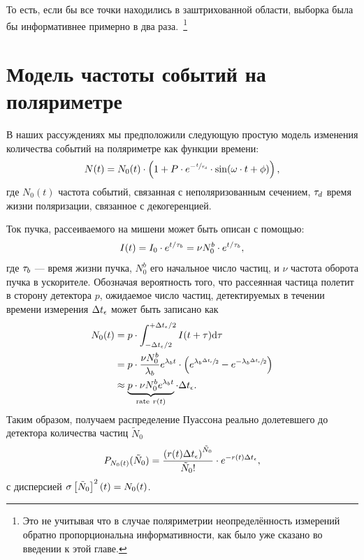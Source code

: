 То есть, если бы все точки находились в заштрихованной области, выборка была бы информативнее примерно в два раза.~\footnote{Это не учитывая что в случае поляриметрии неопределённость измерений обратно пропорциональна информативности, как было уже сказано во введении к этой главе.}

\section{Модель частоты событий на поляриметре}\label{Apx:Stats:Detector_counting_rate}
В наших рассуждениях мы предположили следующую простую модель
изменения количества событий на поляриметре как функции времени:
\begin{equation}\label{eq:DetCntRt}
N(t) = N_0(t)\cdot\bkt{1 + P\cdot e^{-\sfrac{t}{\LTd}}\cdot\sin(\w\cdot t + \phi)},
\end{equation}
где $N_0(t)$ частота событий, связанная с неполяризованным сечением,
$\tau_d$ время жизни поляризации, связанное с декогеренцией.

Ток пучка, рассеиваемого на мишени может быть описан с помощью:
\[
I(t)= I_0\cdot e^{t/\tau_b} = \nu N_0^b\cdot e^{t/\tau_b},
\]
где $\tau_b$ --- время жизни пучка, $N_0^b$ его начальное число частиц,
и $\nu$ частота оборота пучка в ускорителе. Обозначая вероятность того, 
что рассеянная частица полетит в сторону детектора $p$, ожидаемое число
частиц, детектируемых в течении времени измерения $\Delta t_{\epsilon}$ может быть
записано как
\begin{align}
N_0(t) & = p\cdot\int_{-\dtm/2}^{+\dtm/2} I(t+\tau)\rd\tau \notag                    \\
& = p\cdot\frac{\nu N_0^b}{\lamb} e^{\lamb t}\cdot \bkt{e^{\lamb\sfrac{\dtm}{2}} - e^{-\lamb\sfrac{\dtm}{2}}} \notag \\
& \approx \underbrace{p\cdot\nu N_0^b e^{\lamb t}}_{\text{rate}~r(t)} \cdot\dtm.
\end{align}
Таким образом, получаем распределение Пуассона 
реально долетевшего до детектора количества частиц $\tilde{N}_0$
\[
P_{N_0(t)}(\tilde{N}_0) = \frac{\bkt{r(t)\dtm}^{\tilde{N}_0}}{\tilde{N}_0!}\cdot e^{-r(t)\dtm},
\]
с дисперсией $\SD{\tilde{N}_0}^2(t) = N_0(t)$. %

